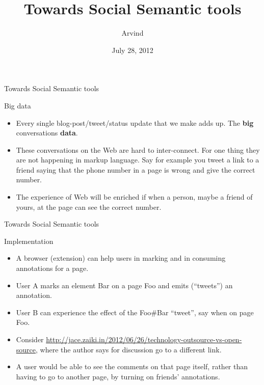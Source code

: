 \documentclass[''urlcolor=red'']{beamer}
\title{Towards Social Semantic tools}
\author{Arvind}
\date{July 28, 2012}
\begin{document}
\begin{frame}
  \titlepage
\end{frame}

\begin{frame}{Towards Social Semantic tools}
  \begin{block}{Big data}
    \begin{itemize}
    \item Every single blog-post/tweet/status update that we make adds up.  The \textbf{big} conversations \textbf{data}.
    \item These conversations on the Web are hard to inter-connect.  For one thing they are not happening in markup language.  Say for example you tweet a link to a friend saying that the phone number in a page is wrong and give the correct number.
    \item The experience of Web will be enriched if when a person, maybe a friend of yours, at the page can see the correct number.
    \end{itemize}
  \end{block}
\end{frame}

\begin{frame}{Towards Social Semantic tools}
  \begin{block}{Implementation}
    \begin{itemize}
    \item A browser (extension) can help users in marking and in consuming annotations for a page.
    \item User A marks an element Bar on a page Foo and emits (``tweets'') an annotation.
    \item User B can experience the effect of the Foo\#Bar ``tweet'', say when on page Foo.
    \item Consider \url{http://jace.zaiki.in/2012/06/26/technology-outsource-vs-open-source}, where the author says for discussion go to a different link.
    \item A user would be able to see the comments on that page itself, rather than having to go to another page, by turning on friends' annotations.
    \end{itemize}
  \end{block}
\end{frame}
\end{document}
